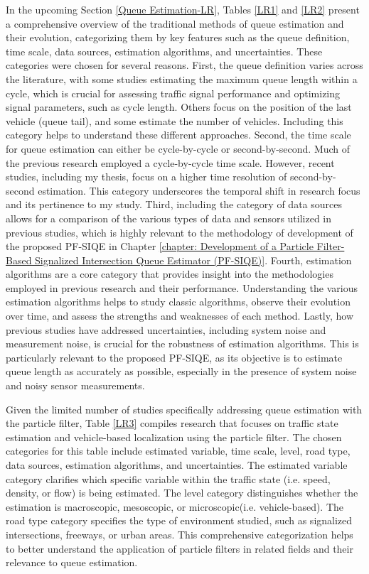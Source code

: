In the upcoming Section \ref{Queue Estimation-LR}, Tables \ref{LR1} and \ref{LR2} present a comprehensive overview of the traditional methods of queue estimation and their evolution, categorizing them by key features such as the queue definition, time scale, data sources, estimation algorithms, and uncertainties. These categories were chosen for several reasons. First, the queue definition varies across the literature, with some studies estimating the maximum queue length within a cycle, which is crucial for assessing traffic signal performance and optimizing signal parameters, such as cycle length. Others focus on the position of the last vehicle (queue tail), and some estimate the number of vehicles. Including this category helps to understand these different approaches. Second, the time scale for queue estimation can either be cycle-by-cycle or second-by-second. Much of the previous research employed a cycle-by-cycle time scale. However, recent studies, including my thesis, focus on a higher time resolution of second-by-second estimation. This category underscores the temporal shift in research focus and its pertinence to my study. Third, including the category of data sources allows for a comparison of the various types of data and sensors utilized in previous studies, which is highly relevant to the methodology of development of the proposed PF-SIQE in Chapter \ref{chapter: Development of a Particle Filter-Based Signalized Intersection Queue Estimator (PF-SIQE)}. Fourth, estimation algorithms are a core category that provides insight into the methodologies employed in previous research and their performance. Understanding the various estimation algorithms helps to study classic algorithms, observe their evolution over time, and assess the strengths and weaknesses of each method. Lastly, how previous studies have addressed uncertainties, including system noise and measurement noise, is crucial for the robustness of estimation algorithms. This is particularly relevant to the proposed PF-SIQE, as its objective is to estimate queue length as accurately as possible, especially in the presence of system noise and noisy sensor measurements.

Given the limited number of studies specifically addressing queue estimation with the particle filter, Table \ref{LR3} compiles research that focuses on traffic state estimation and vehicle-based localization using the particle filter. The chosen categories for this table include estimated variable, time scale, level, road type, data sources, estimation algorithms, and uncertainties. The estimated variable category clarifies which specific variable within the traffic state (i.e. speed, density, or flow) is being estimated. The level category distinguishes whether the estimation is macroscopic, mesoscopic, or microscopic(i.e. vehicle-based). The road type category specifies the type of environment studied, such as signalized intersections, freeways, or urban areas. This comprehensive categorization helps to better understand the application of particle filters in related fields and their relevance to queue estimation.

